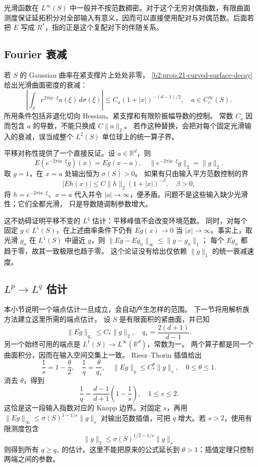 光滑函数在 \(L^\infty(S)\) 中一般并不按范数稠密。对于这个无穷对偶指数，有限曲面测度保证延拓积分对全部输入有意义，因而可以直接使用配对与对偶范数。后面若把 \(E\) 写成 \(R^*\)，指的正是这个复配对下的伴随关系。

\subsection{Fourier 衰减}
\label{b2:subsec:230302}

若 \(S\) 的 Gaussian 曲率在紧支撑片上处处非零，
\cref{b2:prop:21-curved-surface-decay}给出光滑曲面密度的衰减：
\[
 \left|\int_S e^{2\pi\mathrm i x\cdot\xi}a(\xi)\,d\sigma(\xi)\right|
       \leq C_a(1+|x|)^{-(d-1)/2},
 \quad a\in C_c^\infty(S).
\]
所用条件包括非退化切向 Hessian、紧支撑和有限阶振幅导数的控制。
常数 \(C_a\) 因而包含 \(a\) 的导数，不能只换成 \(C\|a\|_2\)。
若作这种替换，会把对每个固定光滑输入的衰减，误当成整个
\(L^2(S)\) 单位球上的统一算子界。

\ProseParagraphBreak
平移对称性提供了一个直接反证。设 \(a\in\mathbb R^d\)，则
\[
 E(e^{-2\pi\mathrm i a\cdot\xi}g)(x)=Eg(x-a),
 \quad
 \|e^{-2\pi\mathrm i a\cdot\xi}g\|_2=\|g\|_2.
\]
取 \(g=1\)，在 \(x=a\) 处输出恒为 \(\sigma(S)>0\)。
如果有只由输入平方范数控制的界
\[
 |Eh(x)|\leq C\|h\|_2(1+|x|)^{-\beta},
 \quad \beta>0,
\]
将 \(h=e^{-2\pi\mathrm i a\cdot\xi}\)、\(x=a\) 代入并令
\(|a|\to\infty\)，便矛盾。问题不是这些输入缺少光滑性；它们全都光滑，
只是导数随调制参数增大。

\ProseParagraphBreak
这不妨碍证明平移不变的 \(L^q\) 估计：平移峰值不会改变环境范数。
同时，对每个固定 \(g\in L^1(S)\)，在上述曲率条件下仍有
\(Eg(x)\to0\) 当 \(|x|\to\infty\)。事实上，取光滑 \(g_n\) 在
\(L^1(S)\) 中逼近 \(g\)，则
\(\|Eg-Eg_n\|_\infty\leq\|g-g_n\|_1\)；
每个 \(Eg_n\) 都趋于零，故其一致极限也趋于零。
这个论证没有给出仅依赖 \(\|g\|_1\) 的统一衰减速度。

\subsection{\texorpdfstring{\(L^p\to L^q\)}{Lp→Lq} 估计}
\label{b2:subsec:230303}

本小节说明一个端点估计一旦成立，会自动产生怎样的范围。
下一节将用解析族方法建立这里所需的端点估计。
设 \(S\) 是有限面积的紧曲面，并已知
\[
 \|Eg\|_{q_*}\leq C_*\|g\|_2,\quad
 q_*=\frac{2(d+1)}{d-1}.
\]
另一个始终可用的端点是 \(L^1(S)\to L^\infty(\mathbb R^d)\)，常数为一。
两个算子都是同一个曲面积分，因而在输入空间交集上一致。
Riesz--Thorin 插值给出
\[
 \frac1s=1-\frac\theta2,\quad
 \frac1q=\frac\theta{q_*},\quad
 \|Eg\|_q\leq C_*^\theta\|g\|_s,
 \quad 0\leq\theta\leq1.
\]
消去 \(\theta\)，得到
\[
 \frac1q=\frac{d-1}{d+1}\left(1-\frac1s\right),
 \quad 1\leq s\leq2.
\]
这恰是这一段输入指数对应的 Knapp 边界。对固定 \(s\)，再用
\(\|Eg\|_\infty\leq\sigma(S)^{1-1/s}\|g\|_s\)
对输出范数插值，可把 \(q\) 增大。若 \(s>2\)，使用有限测度包含
\[
 \|g\|_2\leq\sigma(S)^{1/2-1/s}\|g\|_s
\]
则得到所有 \(q\geq q_*\) 的估计。这里不能把原来的公式延长到
\(\theta>1\)：插值定理只控制两端之间的参数。

